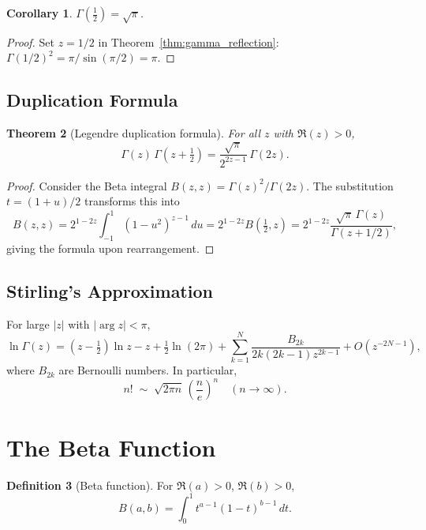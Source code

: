 \documentclass[12pt,a4paper]{amsart}
\newtheorem{theorem}{Theorem}[section]
\newtheorem{corollary}[theorem]{Corollary}
\theoremstyle{definition}
\newtheorem{definition}[theorem]{Definition}
\begin{document}
\begin{corollary}
\(\Gamma\!\left(\tfrac{1}{2}\right) = \sqrt{\pi}\).
\end{corollary}
\begin{proof}
Set \(z = 1/2\) in Theorem~\ref{thm:gamma_reflection}:
\(\Gamma(1/2)^2 = \pi/\sin(\pi/2) = \pi\).
\end{proof}

\subsection{Duplication Formula}

\begin{theorem}[Legendre duplication formula]\label{thm:gamma_duplication}
For all \(z\) with \(\Re(z) > 0\),
\[
  \Gamma(z)\,\Gamma\!\left(z+\tfrac{1}{2}\right)
  = \frac{\sqrt{\pi}}{2^{2z-1}}\,\Gamma(2z).
\]
\end{theorem}

\begin{proof}
Consider the Beta integral \(B(z,z) = \Gamma(z)^2/\Gamma(2z)\).  The substitution
\(t = (1+u)/2\) transforms this into
\[
  B(z,z) = 2^{1-2z}\int_{-1}^1 (1-u^2)^{z-1}\,du = 2^{1-2z} B\!\left(\tfrac{1}{2},z\right)
  = 2^{1-2z}\frac{\sqrt{\pi}\,\Gamma(z)}{\Gamma(z+1/2)},
\]
giving the formula upon rearrangement.
\end{proof}

\subsection{Stirling's Approximation}

For large \(|z|\) with \(|\arg z| < \pi\),
\[
  \ln\Gamma(z) = \left(z-\tfrac{1}{2}\right)\ln z - z + \tfrac{1}{2}\ln(2\pi)
  + \sum_{k=1}^N \frac{B_{2k}}{2k(2k-1)z^{2k-1}} + O\!\left(z^{-2N-1}\right),
\]
where \(B_{2k}\) are Bernoulli numbers.  In particular,
\[
  n! \;\sim\; \sqrt{2\pi n}\,\left(\frac{n}{e}\right)^n \quad (n\to\infty).
\]

\section{The Beta Function}
\label{sec:beta}

\begin{definition}[Beta function]
For \(\Re(a) > 0\), \(\Re(b) > 0\),
\[
  B(a,b) = \int_0^1 t^{a-1}(1-t)^{b-1}\,dt.
\]
\end{definition}
\end{document}
